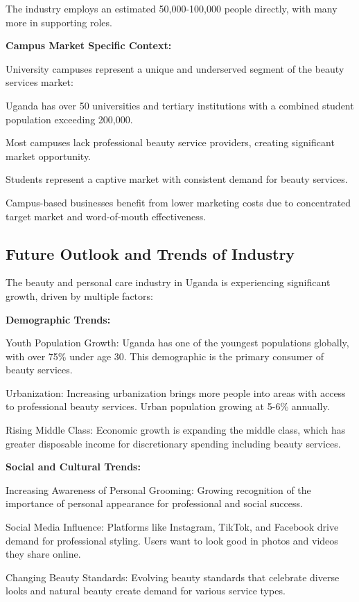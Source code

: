 The industry employs an estimated 50,000-100,000 people directly, with many more in supporting roles.

\textbf{Campus Market Specific Context:}

University campuses represent a unique and underserved segment of the beauty services market:

Uganda has over 50 universities and tertiary institutions with a combined student population exceeding 200,000.

Most campuses lack professional beauty service providers, creating significant market opportunity.

Students represent a captive market with consistent demand for beauty services.

Campus-based businesses benefit from lower marketing costs due to concentrated target market and word-of-mouth effectiveness.

\subsection{Future Outlook and Trends of Industry}

The beauty and personal care industry in Uganda is experiencing significant growth, driven by multiple factors:

\textbf{Demographic Trends:}

Youth Population Growth: Uganda has one of the youngest populations globally, with over 75\% under age 30. This demographic is the primary consumer of beauty services.

Urbanization: Increasing urbanization brings more people into areas with access to professional beauty services. Urban population growing at 5-6\% annually.

Rising Middle Class: Economic growth is expanding the middle class, which has greater disposable income for discretionary spending including beauty services.

\textbf{Social and Cultural Trends:}

Increasing Awareness of Personal Grooming: Growing recognition of the importance of personal appearance for professional and social success.

Social Media Influence: Platforms like Instagram, TikTok, and Facebook drive demand for professional styling. Users want to look good in photos and videos they share online.

Changing Beauty Standards: Evolving beauty standards that celebrate diverse looks and natural beauty create demand for various service types.

